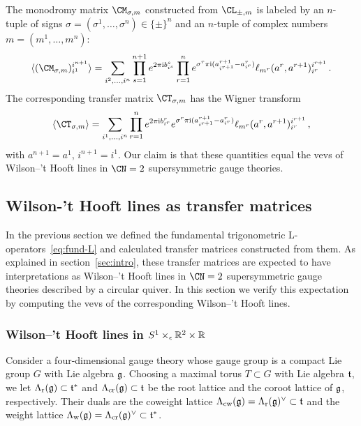 The monodromy matrix $\CM_{\sigma,m}$ constructed from $\CL_{\pm,m}$ is
labeled by an $n$-tuple of signs
$\sigma = (\sigma^1, \dotsc, \sigma^n) \in \{\pm\}^n$ and an $n$-tuple of
complex numbers $m = (m^1, \dotsc, m^n)$:
\begin{equation}
  \label{eq:M-trig}
  \vev{(\CM_{\sigma,m})_{i^1}^{i^{n+1}}}
  =
  \sum_{i^2, \dotsc, i^n}
  \prod_{s=1}^{n+1}
  e^{2\pi\iu b^s_{i^s}}
  \prod_{r=1}^n
  e^{\sigma^r \pi\iu(a^{r+1}_{i^{r+1}} - a^r_{i^r})}
  \ell_{m^r}(a^r, a^{r+1})_{i^r}^{i^{r+1}}
  \,.
\end{equation}
The corresponding transfer matrix $\CT_{\sigma,m}$ has the Wigner transform
\begin{equation}
  \label{eq:T-trig}
  \vev{\CT_{\sigma,m}}
  =
  \sum_{i^1, \dotsc, i^n}
  \prod_{r=1}^n e^{2\pi\iu b^r_{i^r}}
  e^{\sigma^r \pi\iu(a^{r+1}_{i^{r+1}} - a^r_{i^r})}
  \ell_{m^r}(a^r, a^{r+1})_{i^r}^{i^{r+1}}
  \,,
\end{equation}
with $a^{n+1} = a^1$, $i^{n+1} = i^1$.  Our claim is that these
quantities equal the vevs of Wilson--'t Hooft lines in $\CN = 2$
supersymmetric gauge theories.





\subsection{Wilson-'t Hooft lines as transfer matrices}
\label{sec:gauge}

In the previous section we defined the fundamental trigonometric
L-operators~\eqref{eq:fund-L} and calculated transfer matrices
constructed from them.  As explained in section~\ref{sec:intro}, these
transfer matrices are expected to have interpretations as Wilson--'t
Hooft lines in $\CN = 2$ supersymmetric gauge theories described by a
circular quiver.  In this section we verify this expectation by
computing the vevs of the corresponding Wilson--'t Hooft lines.


\subsubsection{Wilson--'t Hooft lines in $S^1 \times_\epsilon \mathbb{R}^2 \times \mathbb{R}$}

Consider a four-dimensional gauge theory whose gauge group is a
compact Lie group $G$ with Lie algebra $\mathfrak{g}$.  Choosing a maximal
torus $T \subset G$ with Lie algebra $\mathfrak{t}$, we let
$\Lambda_{\mathrm{r}}(\mathfrak{g}) \subset \mathfrak{t}^*$ and $\Lambda_{\mathrm{cr}}(\mathfrak{g}) \subset \mathfrak{t}$ be the
root lattice and the coroot lattice of $\mathfrak{g}$, respectively.  Their
duals are the coweight lattice
$\Lambda_{\mathrm{cw}}(\mathfrak{g}) = \Lambda_{\mathrm{r}}(\mathfrak{g})^\vee \subset \mathfrak{t}$ and the weight
lattice $\Lambda_{\mathrm{w}}(\mathfrak{g}) = \Lambda_{\mathrm{cr}}(\mathfrak{g})^\vee \subset \mathfrak{t}^*$.

